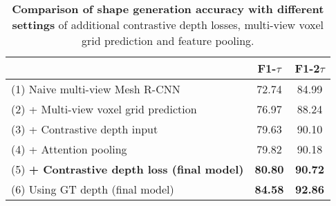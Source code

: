 
\begin{table}[ht]
\begin{center}
\footnotesize
\begin{tabular}{ l c c }
\toprule[1pt]
 &F1-$\tau$ &F1-2$\tau$   \\ \hline
(1) Naive multi-view Mesh R-CNN \qquad \qquad  \qquad  \qquad  \qquad & 72.74 & 84.99 \\
(2) + Multi-view voxel grid prediction & 76.97 & 88.24 \\
(3) + Contrastive depth input             & 79.63 & 90.10 \\
(4) + Attention pooling   & 79.82    & 90.18  \\
(5) \bf{+ Contrastive depth loss (final model)}  & \textbf{80.80} & \textbf{90.72}\\
(6) Using GT depth (final model)                 & \textbf{84.58} & \textbf{92.86} \\
\bottomrule[1pt]
\end{tabular}
\end{center}
\vspace{-4mm}
\caption{
    \textbf{Comparison of shape generation accuracy with different settings} of additional contrastive depth losses, multi-view voxel grid prediction and feature pooling.}
\label{table:ablation_study}
\end{table}

